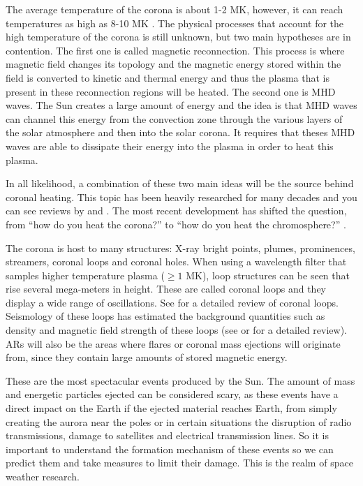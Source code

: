     The average temperature of the corona is about 1-2 MK, however, it can reach temperatures as high as 8-10 MK \citep{markus2004physics}.
	The physical processes that account for the high temperature of the corona is still unknown, but two main hypotheses are in contention.
    The first one is called magnetic reconnection. 
    This process is where magnetic field changes its topology and the magnetic energy stored within the field is converted to kinetic and thermal energy and thus the plasma that is present in these reconnection regions will be heated. 
    The second one is MHD waves.
    The Sun creates a large amount of energy and the idea is that MHD waves can channel this energy from the convection zone through the various layers of the solar atmosphere and then into the solar corona.
	It requires that theses MHD waves are able to dissipate their energy into the plasma in order to heat this plasma.
    
    In all likelihood, a combination of these two main ideas will be the source behind coronal heating.
    This topic has been heavily researched for many decades and you can see reviews by \cite{erdelyi2004heating} and \cite{Parnell2012}.
    The most recent development has shifted the question, from ``how do you heat the corona?'' to ``how do you heat the chromosphere?'' \citep{Aschwanden2007}.
    
    The corona is host to many structures: X-ray bright points, plumes, prominences, streamers, coronal loops and coronal holes.
    When using a wavelength filter that samples higher temperature plasma ($\ge1$ MK), loop structures can be seen that rise several mega-meters in height.
    These are called coronal loops and they display a wide range of oscillations.
    See \cite{2010LRSP....7....5R} for a detailed review of coronal loops.
    Seismology of these loops has estimated the background quantities such as density and magnetic field strength of these loops (see \cite{2005RSPTA.363.2743D} or \cite{Banerjee2007} for a detailed review). 
    ARs  will also be the areas where flares or coronal mass ejections will originate from, since they contain large amounts of stored magnetic energy.
    
    These are the most spectacular events produced by the Sun.
    The amount of mass and energetic particles ejected can be considered scary, as these events have a direct impact on the Earth if the ejected material reaches Earth, from simply creating the aurora near the poles or in certain situations the disruption of radio transmissions, damage to satellites and electrical transmission lines.
    So it is important to understand the formation mechanism of these events so we can predict them and take measures to limit their damage.
    This is the realm of space weather research. 
    

